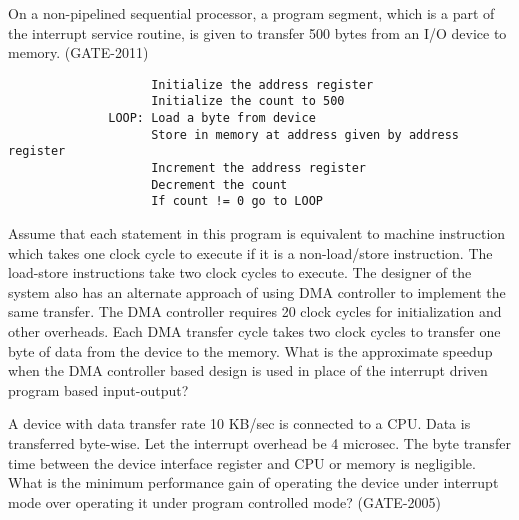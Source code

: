 \begin{questyle}
  \question  On a non-pipelined sequential processor, a program segment, which is a part of the
             interrupt service routine, is given to transfer 500 bytes from an I/O device to memory.  (GATE-2011)
              \begin{lstlisting}
                    Initialize the address register
                    Initialize the count to 500
              LOOP: Load a byte from device
                    Store in memory at address given by address register
                    Increment the address register
                    Decrement the count
                    If count != 0 go to LOOP
              \end{lstlisting}
              Assume that each statement in this program is equivalent to machine instruction which
              takes one clock cycle to execute if it is a non-load/store instruction. The load-store
              instructions take two clock cycles to execute. The designer of the system also has an
              alternate approach of using DMA controller to implement the same transfer. The DMA
              controller requires 20 clock cycles for initialization and other overheads. Each DMA
              transfer cycle takes two clock cycles to transfer one byte of data from the device to
              the memory. What is the approximate speedup when the DMA controller based design is
              used in place of the interrupt driven program based input-output?
  \begin{oneparchoices}
  \end{oneparchoices}
\end{questyle}


\begin{questyle}
  \question  A device with data transfer rate 10 KB/sec is connected to a CPU. Data is
  transferred byte-wise. Let the interrupt overhead be 4 microsec. The byte transfer time
  between the device interface register and CPU or memory is negligible. What is the
  minimum performance gain of operating the device under interrupt mode over operating
  it under program controlled mode?  (GATE-2005)
  \begin{oneparchoices}
  \end{oneparchoices}
\end{questyle}


